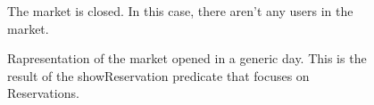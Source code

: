 \begin{figure}[H]

  \label{marketClosed}
  \centering
   \caption{The market is closed. In this case, there aren't any users in the market.}

   
\end{figure}

\begin{figure}[H]
  \label{shorReserv}
  
  \centering
   \caption{Rapresentation of the market opened in a generic day. This is the result of the showReservation predicate that focuses on Reservations.} 
\end{figure}

